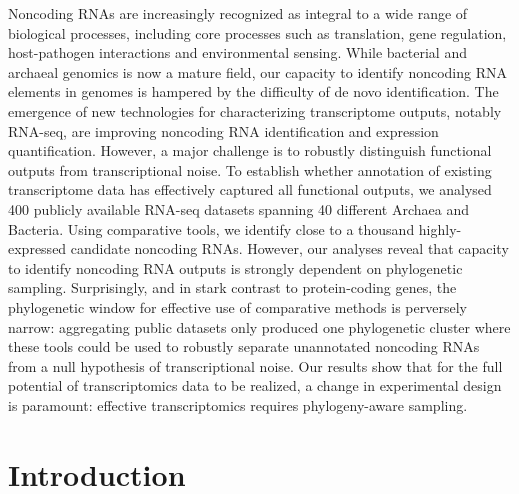 \documentclass[10pt]{article}
\begin{document}
Noncoding RNAs are increasingly recognized as integral to a wide range
of biological processes, including core processes such as translation,
gene regulation, host-pathogen interactions and environmental
sensing. While bacterial and archaeal genomics is now a mature field,
our capacity to identify noncoding RNA elements in genomes is hampered
by the difficulty of de novo identification. The emergence of new
technologies for characterizing transcriptome outputs, notably
RNA-seq, are improving noncoding RNA identification and expression
quantification. However, a major challenge is to robustly distinguish
functional outputs from transcriptional noise. To establish whether
annotation of existing transcriptome data has effectively captured all
functional outputs, we analysed 400 publicly available RNA-seq
datasets spanning 40 different Archaea and Bacteria. Using comparative
tools, we identify close to a thousand highly-expressed candidate
noncoding RNAs. However, our analyses reveal that capacity to identify
noncoding RNA outputs is strongly dependent on phylogenetic
sampling. Surprisingly, and in stark contrast to protein-coding genes,
the phylogenetic window for effective use of comparative methods is
perversely narrow: aggregating public datasets only produced one
phylogenetic cluster where these tools could be used to robustly
separate unannotated noncoding RNAs from a null hypothesis of
transcriptional noise. Our results show that for the full potential of
transcriptomics data to be realized, a change in experimental design
is paramount: effective transcriptomics requires phylogeny-aware
sampling.



\section*{Introduction}
\end{document}
